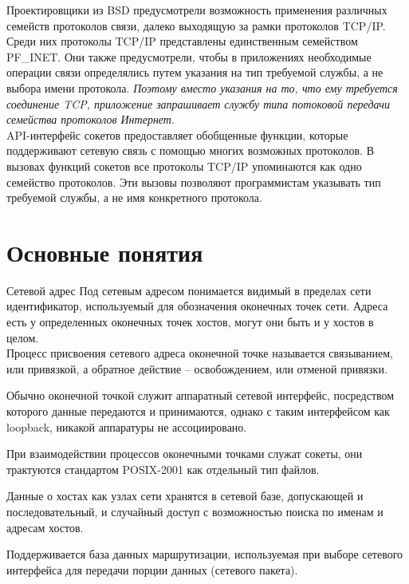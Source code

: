 \begin{frame}{}
Проектировщики из BSD предусмотрели возможность применения различных семейств протоколов связи,  далеко выходящую за рамки протоколов TCP/IP. \\
Среди них протоколы TCP/IP представлены единственным семейством PF\_INET. Они также предусмотрели,  
чтобы в приложениях необходимые операции связи определялись путем указания на тип требуемой службы,
а не выбора имени протокола. {\itshape Поэтому вместо указания на то,  что ему требуется соединение TCP,
приложение запрашивает службу типа потоковой передачи семейства протоколов Интернет}.\\

API-интерфейс сокетов предоставляет обобщенные функции,  которые поддерживают сетевую связь с помощью многих возможных протоколов. В вызовах функций сокетов все протоколы TCP/IP упоминаются как одно семейство протоколов. Эти вызовы позволяют программистам указывать тип требуемой службы,  а не имя конкретного протокола.
\end{frame}

\section{Основные понятия}

\begin{frame}{Сетевой адрес}
Под сетевым адресом понимается видимый в пределах сети идентификатор, используемый для обозначения оконечных точек сети. Адреса есть у определенных оконечных точек хостов, могут они быть и у хостов в целом. \\
\pause
Процесс присвоения сетевого адреса оконечной точке называется связыванием, или привязкой, а обратное действие -- освобождением, или отменой привязки. 

Обычно оконечной точкой служит аппаратный сетевой интерфейс, посредством которого данные передаются и принимаются, однако с таким интерфейсом как loopback, никакой аппаратуры не ассоциировано. 

\pause
При взаимодействии процессов оконечными точками служат сокеты, они трактуются стандартом POSIX-2001 как отдельный тип файлов.
\end{frame}

\begin{frame}{}
Данные о хостах как узлах сети хранятся в сетевой базе, допускающей и последовательный, и случайный доступ с возможностью поиска по именам и адресам хостов. 

Поддерживается база данных маршрутизации, используемая при выборе сетевого интерфейса для передачи порции данных (сетевого пакета). 
\end{frame}

